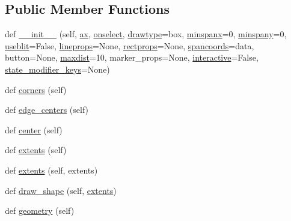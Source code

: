 \subsection*{Public Member Functions}
\begin{DoxyCompactItemize}
\item 
def \hyperlink{classmatplotlib_1_1widgets_1_1RectangleSelector_a62a9c79bc001b6d53548b4a1b091c86f}{\+\_\+\+\_\+init\+\_\+\+\_\+} (self, \hyperlink{classmatplotlib_1_1widgets_1_1AxesWidget_ac0722858b7001d10a42055dc90420b4f}{ax}, \hyperlink{classmatplotlib_1_1widgets_1_1__SelectorWidget_ad893af1ad010d595c7cce1106b48d854}{onselect}, \hyperlink{classmatplotlib_1_1widgets_1_1RectangleSelector_aea33252f7eebfc3d4ac3e5450e5cad75}{drawtype}=\textquotesingle{}box\textquotesingle{}, \hyperlink{classmatplotlib_1_1widgets_1_1RectangleSelector_aa6d7b9426a8a97b346c54f7c75bfa5f0}{minspanx}=0, \hyperlink{classmatplotlib_1_1widgets_1_1RectangleSelector_a9c159489f1d66c41b6321de9d44c58d3}{minspany}=0, \hyperlink{classmatplotlib_1_1widgets_1_1__SelectorWidget_a6d178ef2dd7ec61c11b18302de3f43bf}{useblit}=False, \hyperlink{classmatplotlib_1_1widgets_1_1RectangleSelector_a59f14aaa8496bcc05a0c8ec0426cd892}{lineprops}=None, \hyperlink{classmatplotlib_1_1widgets_1_1RectangleSelector_aebc448d5d14726f0b9f971b33d6d4884}{rectprops}=None, \hyperlink{classmatplotlib_1_1widgets_1_1RectangleSelector_a43cc351b3b8d26c57c70805867004bff}{spancoords}=\textquotesingle{}data\textquotesingle{}, button=None, \hyperlink{classmatplotlib_1_1widgets_1_1RectangleSelector_ae49d9b1d3c8220db0f5a90c23ecb4e43}{maxdist}=10, marker\+\_\+props=None, \hyperlink{classmatplotlib_1_1widgets_1_1RectangleSelector_ab980b6a7e434ea027d7e981539ac345d}{interactive}=False, \hyperlink{classmatplotlib_1_1widgets_1_1__SelectorWidget_ada64a11df65865f0f79e47f7c731b81c}{state\+\_\+modifier\+\_\+keys}=None)
\item 
def \hyperlink{classmatplotlib_1_1widgets_1_1RectangleSelector_a4c1f97b8742e8e7cbef02640aef5adaa}{corners} (self)
\item 
def \hyperlink{classmatplotlib_1_1widgets_1_1RectangleSelector_a881366fd2b593079fc3ab301500dd1b2}{edge\+\_\+centers} (self)
\item 
def \hyperlink{classmatplotlib_1_1widgets_1_1RectangleSelector_a82fca906f1d08f92f9c32743699bdb96}{center} (self)
\item 
def \hyperlink{classmatplotlib_1_1widgets_1_1RectangleSelector_a44d88a2eb4b6b41dece42abedbc49d7c}{extents} (self)
\item 
def \hyperlink{classmatplotlib_1_1widgets_1_1RectangleSelector_aadc2603dcd68fe9c1cadc2a8a063bd51}{extents} (self, extents)
\item 
def \hyperlink{classmatplotlib_1_1widgets_1_1RectangleSelector_a9e5b1f8735f42404110b1194b9c0e651}{draw\+\_\+shape} (self, \hyperlink{classmatplotlib_1_1widgets_1_1RectangleSelector_a9ce3b014e6e5ba477b57eeedd6a24e3f}{extents})
\item 
def \hyperlink{classmatplotlib_1_1widgets_1_1RectangleSelector_a274a9eaa9dbe041fd0599c23c80f451e}{geometry} (self)
\end{DoxyCompactItemize}
